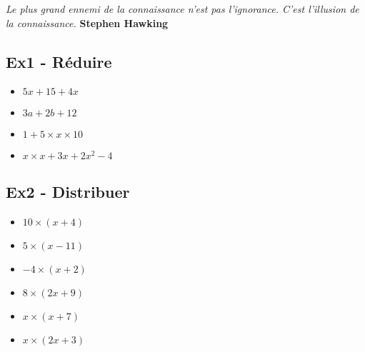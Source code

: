 
\setlength{\columnseprule}{0pt}



\begin{center}
  \textit{Le plus grand ennemi de la connaissance n'est pas l'ignorance. C'est l'illusion de la connaissance.} 
  \textbf{Stephen Hawking}
\end{center}


\subsection*{Ex1 - Réduire}

\begin{multicols}{2}
  \begin{itemize}[label={$\bullet$}]
  \item $5x + 15 + 4x $ \\
  \item $3a + 2b + 12 $\\
  \item $1 + 5 \times x \times 10 $\\
  \item $x \times x + 3x + 2x^2 -4 $\\
\end{itemize} \end{multicols}

\subsection*{Ex2 - Distribuer}

\begin{multicols}{2}
  \begin{itemize}[label={$\bullet$}]
  \item $10 \times ( x + 4 ) $\\
  \item $5 \times ( x - 11 ) $\\
  \item $-4 \times ( x + 2 ) $\\
  \item $8 \times ( 2x + 9 ) $\\
  \item $x \times ( x + 7 ) $\\
  \item $x \times ( 2x + 3 ) $\\
\end{itemize} \end{multicols}

